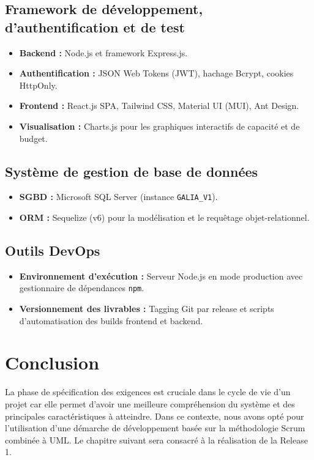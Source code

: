 \subsection{Framework de développement, d'authentification et de test}
\begin{itemize}
    \item \textbf{Backend :} Node.js et framework Express.js.
    \item \textbf{Authentification :} JSON Web Tokens (JWT), hachage Bcrypt, cookies HttpOnly.
    \item \textbf{Frontend :} React.js SPA, Tailwind CSS, Material UI (MUI), Ant Design.
    \item \textbf{Visualisation :} Charts.js pour les graphiques interactifs de capacité et de budget.
\end{itemize}

\subsection{Système de gestion de base de données}
\begin{itemize}
    \item \textbf{SGBD :} Microsoft SQL Server (instance \texttt{GALIA\_V1}).
    \item \textbf{ORM :} Sequelize (v6) pour la modélisation et le requêtage objet-relationnel.
\end{itemize}

\subsection{Outils DevOps}
\begin{itemize}
    \item \textbf{Environnement d'exécution :} Serveur Node.js en mode production avec gestionnaire de dépendances \texttt{npm}.
    \item \textbf{Versionnement des livrables :} Tagging Git par release et scripts d'automatisation des builds frontend et backend.
\end{itemize}

\section*{Conclusion}
La phase de spécification des exigences est cruciale dans le cycle de vie d'un projet car elle permet d'avoir une meilleure compréhension du système et des principales caractéristiques à atteindre. Dans ce contexte, nous avons opté pour l'utilisation d'une démarche de développement basée sur la méthodologie Scrum combinée à UML. Le chapitre suivant sera consacré à la réalisation de la Release 1.
